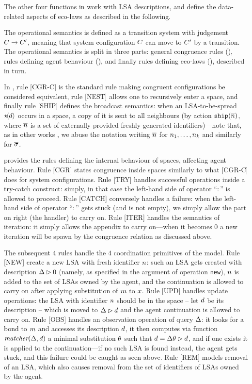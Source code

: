 \documentclass[12pt,a4paper,twoside,openright]{book}
\begin{document}
The other four functions in  work with LSA descriptions, and define the data-related aspects of eco-laws as described in the following.

The operational semantics is defined as a transition system with judgement $C\xrightarrow{}C'$, meaning that system configuration $C$ can move to $C'$ by a transition.
%
The operational semantics is split in three parts: general congruence rules (), rules defining agent behaviour (), and finally rules defining eco-laws (), described in turn.

In , rule [CGR-C] is the standard rule making congruent configurations be considered equivalent, rule [NEST] allows one to recursively enter a space, and finally rule [SHIP] defines the broadcast semantics: when an LSA-to-be-spread $\star\!\langle d\rangle$ occurs in a space, a copy of it is sent to all neighbours (by action $\texttt{ship}(\overline{n})$, where $\overline{n}$ is a set of externally provided freshly-generated identifiers)---note that, as in other works \cite{FJ}, we abuse the notation writing $\overline{n}$ for $n_1,\ldots,n_k$ and similarly for $\overline{\sigma}$.

 provides the rules defining the internal behaviour of spaces, affecting agent behaviour.
%
Rule [CGR] states congruence inside spaces similarly to what [CGR-C] does for system configurations.
%
Rule [TRY] handles successful operations inside a try-catch construct: simply, in that case the left-hand side of operator ``$:$'' is allowed to proceed.
%
Rule [CATCH] conversely handles a failure: when the left-hand side of operator ``$:$'' gets stuck (and is not empty), we simply allow the part on right (the handler) to carry on.
%
Rule [ITER] handles the semantics of iteration: it simply allows the appendix to carry on---when it becomes $0$ a new iteration will be spawn by the congruence relation as discussed above.

The subsequent $4$ rules handle the $4$ coordination primitives of the model.
%
Rule [NEW] create a new LSA with fresh identifier $n$: such an LSA gets created with description $\Delta\rhd 0$ (namely, as specified in the argument of operation \texttt{new}), $n$ is added to the set of LSAs owned by the agent, and the continuation is allowed to carry on after applying substitution of $m$ to $x$.
%
Rule [UPD] handles update operations: the LSA with identifier $n$ should be in the space -- let $d$ be its description -- which is moved to $\Delta\rhd d$ and the agent continuation is allowed to carry on.
%
Rule [OBS] handles an observation operation of query $\Delta$: it looks for a bond to $m$ and accesses its description $d$, it then computes via function $\textit{matcher}(\Delta,d)$ a minimal substitution $\theta$ such that $d=\Delta\theta\rhd d$, and if one exists it is applied to the continuation---if no such LSA is found instead, the agent gets stuck, and this failure could be caught as seen above.
%
Rule [REM] models removal of an LSA, which also causes removal from the set of identifiers of LSAs owned by the agent.
\end{document}
